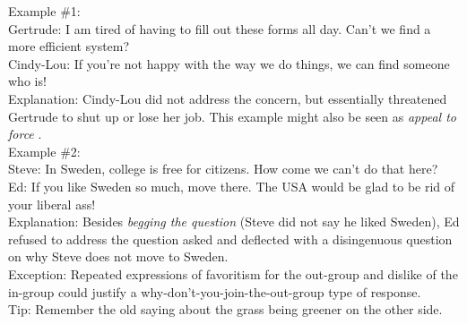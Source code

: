 \documentclass[a4paper,12pt,single,pdftex]{scrbook}
\begin{document}
    
      Example \#1:
    \\

    
      Gertrude: I am tired of having to fill out these forms all day. Can't we find a more efficient system?
    \\

    
      Cindy-Lou: If you're not happy with the way we do things, we can find someone who is!
    \\

    
      Explanation: Cindy-Lou did not address the concern, but essentially threatened Gertrude to shut up or lose her job. This example might also be seen as {\it appeal to force} .
    \\

    
      Example \#2:
    \\

    
      Steve: In Sweden, college is free for citizens. How come we can't do that here?
    \\

    
      Ed: If you like Sweden so much, move there. The USA would be glad to be rid of your liberal ass!
    \\

    
      Explanation: Besides {\it begging the question} (Steve did not say he liked Sweden), Ed refused to address the question asked and deflected with a disingenuous question on why Steve does not move to Sweden.
    \\

    
      Exception: Repeated expressions of favoritism for the out-group and dislike of the in-group could justify a why-don't-you-join-the-out-group type of response.
    \\

    
      Tip: Remember the old saying about the grass being greener on the other side.
    \\
\end{document}
